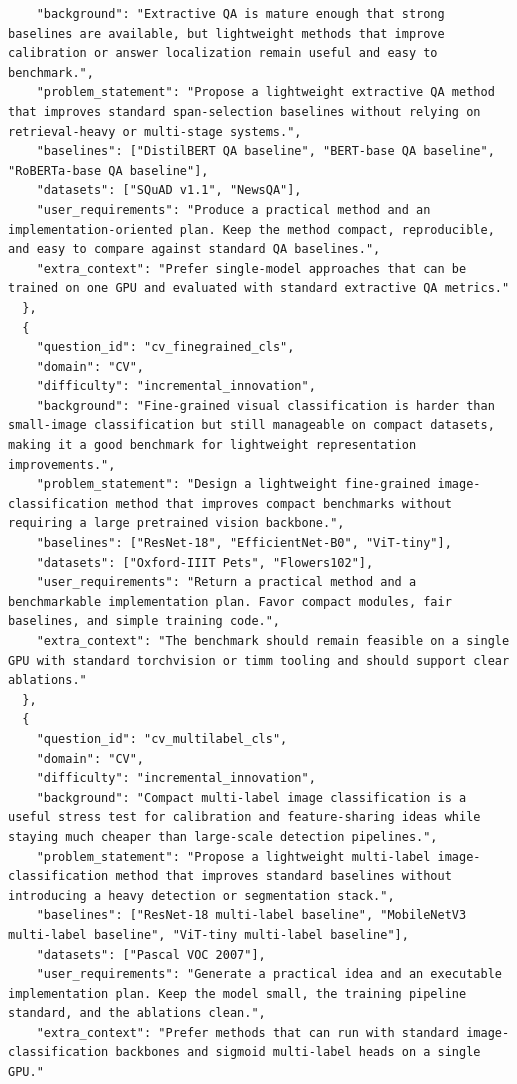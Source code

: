 \documentclass{opendatalab}
\begin{document}
\begin{lstlisting}
    "background": "Extractive QA is mature enough that strong baselines are available, but lightweight methods that improve calibration or answer localization remain useful and easy to benchmark.",
    "problem_statement": "Propose a lightweight extractive QA method that improves standard span-selection baselines without relying on retrieval-heavy or multi-stage systems.",
    "baselines": ["DistilBERT QA baseline", "BERT-base QA baseline", "RoBERTa-base QA baseline"],
    "datasets": ["SQuAD v1.1", "NewsQA"],
    "user_requirements": "Produce a practical method and an implementation-oriented plan. Keep the method compact, reproducible, and easy to compare against standard QA baselines.",
    "extra_context": "Prefer single-model approaches that can be trained on one GPU and evaluated with standard extractive QA metrics."
  },
  {
    "question_id": "cv_finegrained_cls",
    "domain": "CV",
    "difficulty": "incremental_innovation",
    "background": "Fine-grained visual classification is harder than small-image classification but still manageable on compact datasets, making it a good benchmark for lightweight representation improvements.",
    "problem_statement": "Design a lightweight fine-grained image-classification method that improves compact benchmarks without requiring a large pretrained vision backbone.",
    "baselines": ["ResNet-18", "EfficientNet-B0", "ViT-tiny"],
    "datasets": ["Oxford-IIIT Pets", "Flowers102"],
    "user_requirements": "Return a practical method and a benchmarkable implementation plan. Favor compact modules, fair baselines, and simple training code.",
    "extra_context": "The benchmark should remain feasible on a single GPU with standard torchvision or timm tooling and should support clear ablations."
  },
  {
    "question_id": "cv_multilabel_cls",
    "domain": "CV",
    "difficulty": "incremental_innovation",
    "background": "Compact multi-label image classification is a useful stress test for calibration and feature-sharing ideas while staying much cheaper than large-scale detection pipelines.",
    "problem_statement": "Propose a lightweight multi-label image-classification method that improves standard baselines without introducing a heavy detection or segmentation stack.",
    "baselines": ["ResNet-18 multi-label baseline", "MobileNetV3 multi-label baseline", "ViT-tiny multi-label baseline"],
    "datasets": ["Pascal VOC 2007"],
    "user_requirements": "Generate a practical idea and an executable implementation plan. Keep the model small, the training pipeline standard, and the ablations clean.",
    "extra_context": "Prefer methods that can run with standard image-classification backbones and sigmoid multi-label heads on a single GPU."

\end{lstlisting}
\end{document}
